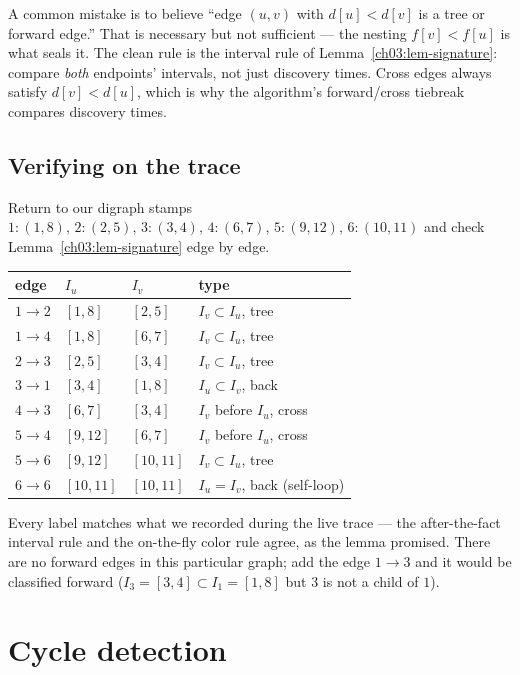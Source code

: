 \begin{trapbox}
A common mistake is to believe ``edge $(u,v)$ with $d[u]<d[v]$ is a tree or forward edge.'' That is necessary but not sufficient --- the nesting $f[v]<f[u]$ is what seals it. The clean rule is the interval rule of Lemma~\ref{ch03:lem-signature}: compare \emph{both} endpoints' intervals, not just discovery times. Cross edges always satisfy $d[v]<d[u]$, which is why the algorithm's forward/cross tiebreak compares discovery times.
\end{trapbox}

\subsection{Verifying on the trace}

Return to our digraph stamps $1{:}(1,8),\,2{:}(2,5),\,3{:}(3,4),\,4{:}(6,7),\,5{:}(9,12),\,6{:}(10,11)$ and check Lemma~\ref{ch03:lem-signature} edge by edge.

\begin{center}
\begin{tabular}{@{}llll@{}}
\toprule
edge & $I_u$ & $I_v$ & type \\
\midrule
$1\to2$ & $[1,8]$ & $[2,5]$ & $I_v\subset I_u$, tree \\
$1\to4$ & $[1,8]$ & $[6,7]$ & $I_v\subset I_u$, tree \\
$2\to3$ & $[2,5]$ & $[3,4]$ & $I_v\subset I_u$, tree \\
$3\to1$ & $[3,4]$ & $[1,8]$ & $I_u\subset I_v$, back \\
$4\to3$ & $[6,7]$ & $[3,4]$ & $I_v$ before $I_u$, cross \\
$5\to4$ & $[9,12]$ & $[6,7]$ & $I_v$ before $I_u$, cross \\
$5\to6$ & $[9,12]$ & $[10,11]$ & $I_v\subset I_u$, tree \\
$6\to6$ & $[10,11]$ & $[10,11]$ & $I_u=I_v$, back (self-loop) \\
\bottomrule
\end{tabular}
\end{center}

Every label matches what we recorded during the live trace --- the after-the-fact interval rule and the on-the-fly color rule agree, as the lemma promised. There are no forward edges in this particular graph; add the edge $1\to3$ and it would be classified forward ($I_3=[3,4]\subset I_1=[1,8]$ but $3$ is not a child of $1$).

\section{Cycle detection}
\label{ch03:cycles}

